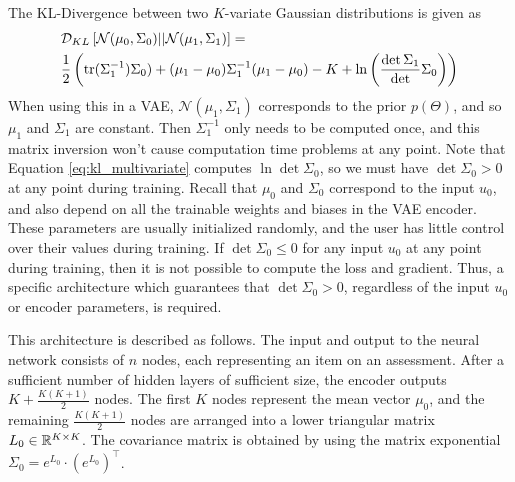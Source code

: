 The KL-Divergence between two $K$-variate Gaussian distributions is given as
\begin{equation}
\begin{split}
  &\mathcal{D}_{KL}\left[\mathcal{N}(\mu_0, \Sigma_0) || \mathcal{N}(\mu_1, \Sigma_1) \right] = \\
&\frac{1}{2} \left( \text{tr}(\Sigma_1^{-1}) \Sigma_0) + (\mu_1 - \mu_0) \Sigma_1^{-1} (\mu_1 - \mu_0) - K + \ln\left( \frac{\det \Sigma_1}\det \Sigma_0 \right) \right)
  \label{eq:kl_multivariate}
\end{split}
\end{equation}
When using this in a VAE, $\mathcal{N}(\mu_1, \Sigma_1)$ corresponds to the prior $p(\Theta)$, and so $\mu_1$ and $\Sigma_1$ are constant. Then $\Sigma_1^{-1}$ only needs to be computed once, and this matrix inversion won't cause computation time problems at any point. Note that Equation \ref{eq:kl_multivariate} computes $\ln \det \Sigma_0$, so we must have $\det \Sigma_0 > 0$ at any point during training. Recall that $\mu_0$ and $\Sigma_0$ correspond to the input $u_0$, and also depend on all the trainable weights and biases in the VAE encoder. These parameters are usually initialized randomly, and the user has little control over their values during training. If $\det \Sigma_0 \leq 0$ for any input $u_0$ at any point during training, then it is not possible to compute the loss and gradient. Thus, a specific architecture which guarantees that $\det \Sigma_0 > 0$, regardless of the input $u_0$ or encoder parameters, is required.

This architecture is described as follows. The input and output to the neural network consists of $n$ nodes, each representing an item on an assessment. After a sufficient number of hidden layers of sufficient size, the encoder outputs $K + \frac{K(K+1)}{2}$ nodes. The first $K$ nodes represent the mean vector $\mu_0$, and the remaining $\frac{K(K+1)}{2}$ nodes are arranged into a lower triangular matrix $L_0 \in \mathbb{R}^{K\times K}$. The covariance matrix is obtained by using the matrix exponential $\Sigma_0 = e^{L_0} \cdot \left( e^{L_0} \right)^\top$.

